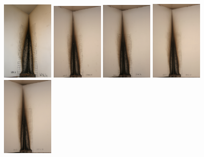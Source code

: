 \documentclass[twoside]{uocthesis}
\begin{document}
{\begin{figure}[p]
	\includegraphics[width=1.0in]{../Figures/GBNG34_P5150482}
	\includegraphics[width=1.0in]{../Figures/GBNG35_IMG_9166}
	\includegraphics[width=1.0in]{../Figures/GBNG36_IMG_9181}
	\includegraphics[width=1.0in]{../Figures/GBNG37_IMG_9194}
	\includegraphics[width=1.0in]{../Figures/GBNG38_IMG_9208} \\


\end{figure}}
\end{document}
